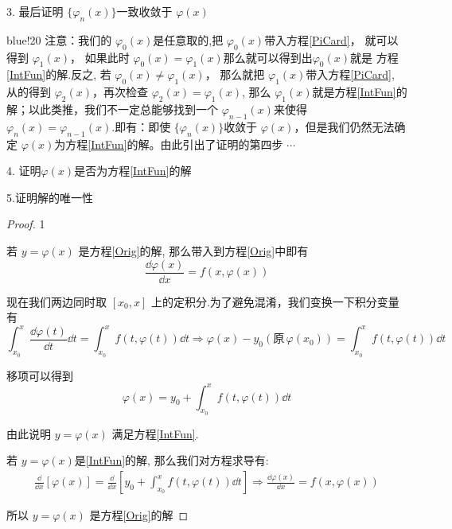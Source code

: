 3. 最后证明 $\{\varphi_n(x)\}$一致收敛于 $\varphi(x)$

\begin{formal}{blue!20}
    注意：我们的 $\varphi_0(x)$是任意取的,把 $\varphi_0(x)$带入方程\ref{PiCard}， 就可以得到 $\varphi_1(x)$， 如果此时 $\varphi_0(x)=\varphi_1(x)$那么就可以得到出$\varphi_0(x)$就是
    方程\ref{IntFun}的解.反之, 若 $\varphi_0(x)\neq \varphi_1(x)$， 那么就把 $\varphi_1(x)$带入方程\ref{PiCard}, 从的得到 $\varphi_2(x)$，再次检查 $\varphi_2(x)=\varphi_1(x)$, 
    那么 $\varphi_1(x)$就是方程\ref{IntFun}的解；以此类推，我们不一定总能够找到一个 $\varphi_{n-1}(x)$来使得 $\varphi_n(x)= \varphi_{n-1}(x)$.即有：即使 $\{\varphi_n(x)\}$收敛于 $\varphi(x)$，但是我们仍然无法确定
    $\varphi(x)$为方程\ref{IntFun}的解。由此引出了证明的第四步 $\cdots$     
\end{formal}


4. 证明$\varphi(x)$是否为方程\ref{IntFun}的解

5.证明解的唯一性

\begin{proof}{\sf \color{orange} 1}\par
    若 $y = \varphi(x)$ 是方程\ref{Orig}的解, 那么带入到方程\ref{Orig}中即有
    \[
        \frac{\dd \varphi(x)}{\dd x}=f(x, \varphi(x))    
    \]

    现在我们两边同时取 $[x_0, x]$ 上的定积分.为了避免混淆，我们变换一下积分变量有
    \[
        \int_{x_0}^{x}{\frac{\dd \varphi(t)}{\dd t} \dd t} = \int_{x_0}^{x}{f(t, \varphi(t)) \dd t}    
        \Longrightarrow
        \varphi(x)-y_0(\mbox{原}\,\varphi(x_0)) = \int_{x_0}^{x}{f(t, \varphi(t)) \dd t}    
    \]

    移项可以得到
    \[
        \varphi(x) =  y_0 + \int_{x_0}^{x}{f(t, \varphi(t)) \dd t}    
    \]

    由此说明 $y = \varphi(x)$ 满足方程\ref{IntFun}.

    若 $y = \varphi(x)$是\ref{IntFun}的解, 那么我们对方程求导有:
    \begin{align*}
        \frac{\dd }{\dd x}[\varphi(x)] = \frac{\dd}{\dd x}\left[y_0 + \int_{x_0}^{x}{f(t, \varphi(t)) \dd t}\right]
        \Longrightarrow
        \frac{\dd \varphi(x)}{\dd x}=f(x, \varphi(x))
    \end{align*}

    所以 $y = \varphi(x)$ 是方程\ref{Orig}的解
\end{proof}


